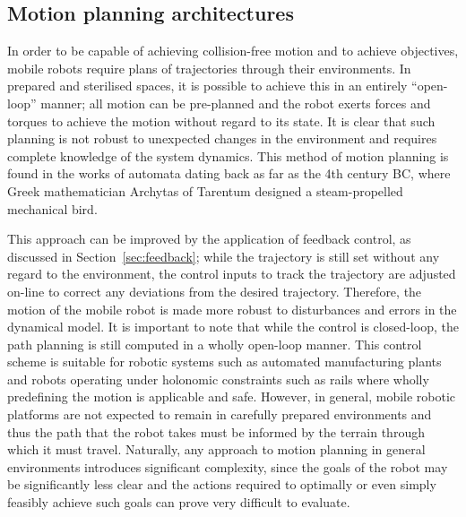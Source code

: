 \subsection{Motion planning architectures}
In order to be capable of achieving collision-free motion and to achieve objectives, mobile robots require plans of trajectories through their environments. In prepared and sterilised spaces, it is possible to achieve this in an entirely ``open-loop'' manner; all motion can be pre-planned and the robot exerts forces and torques to achieve the motion without regard to its state. It is clear that such planning is not robust to unexpected changes in the environment and requires complete knowledge of the system dynamics. This method of motion planning is found in the works of automata dating back as far as the 4th century BC, where Greek mathematician Archytas of Tarentum designed a steam-propelled mechanical bird.

This approach can be improved by the application of feedback control, as discussed in Section~\ref{sec:feedback}; while the trajectory is still set without any regard to the environment, the control inputs to track the trajectory are adjusted on-line to correct any deviations from the desired trajectory. Therefore, the motion of the mobile robot is made more robust to disturbances and errors in the dynamical model. It is important to note that while the control is closed-loop, the path planning is still computed in a wholly open-loop manner. This control scheme is suitable for robotic systems such as automated manufacturing plants and robots operating under holonomic constraints such as rails where wholly predefining the motion is applicable and safe. However, in general, mobile robotic platforms are not expected to remain in carefully prepared environments and thus the path that the robot takes must be informed by the terrain through which it must travel. Naturally, any approach to motion planning in general environments introduces significant complexity, since the goals of the robot may be significantly less clear and the actions required to optimally or even simply feasibly achieve such goals can prove very difficult to evaluate.

